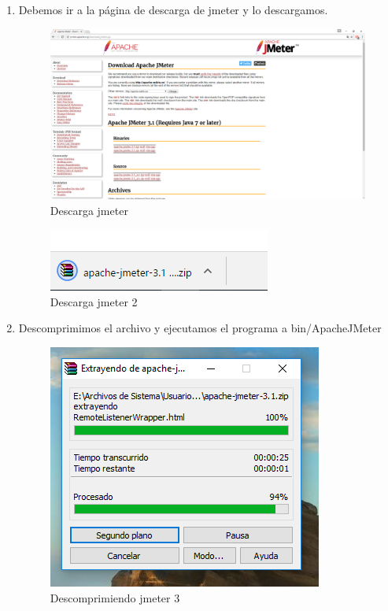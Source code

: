 \begin{enumerate}
	\item Debemos ir a la página de descarga \cite{descarga} de jmeter \cite{jmeter} y lo descargamos.
	
	\begin{figure}[H] %
		\centering
		\includegraphics[scale=0.3]{pics/1}  %
		\caption{Descarga jmeter} \label{fig:jmt1}
	\end{figure}

	\begin{figure}[H] %
	\centering
	\includegraphics[scale=0.4]{pics/2}  %
	\caption{Descarga jmeter 2} \label{fig:jmt2}
	\end{figure}

	\item Descomprimimos el archivo y ejecutamos el programa a bin/ApacheJMeter 
	
	\begin{figure}[H] %
		\centering
		\includegraphics[scale=0.5]{pics/3}  %
		\caption{Descomprimiendo jmeter 3} \label{fig:jmt3}
	\end{figure}


\end{enumerate}
